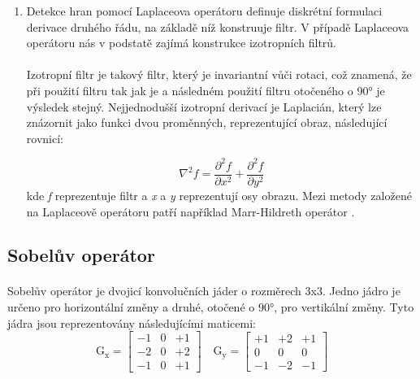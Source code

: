 \begin{enumerate}
    \item Detekce hran pomocí Laplaceova operátoru definuje diskrétní formulaci derivace druhého řádu, na základě níž konstruuje filtr. V případě Laplaceova operátoru nás v podstatě zajímá konstrukce izotropních filtrů.
    \paragraph{} Izotropní filtr je takový filtr, který je invariantní vůči rotaci, což znamená, že při použití filtru tak jak je a následném použití filtru otočeného o 90° je výsledek stejný. Nejjednodušší izotropní derivací je Laplacián, který lze znázornit jako funkci dvou proměnných, reprezentující obraz, následující rovnicí:

    \begin{equation}
    \nabla^2 f=\frac{\partial^2 f}{\partial x^2}+\frac{\partial^2 f}{\partial y^2}
    \end{equation}
    kde \textit{f} reprezentuje filtr a \textit{x} a \textit{y} reprezentují osy obrazu. Mezi metody založené na Laplaceově operátoru patří například Marr-Hildreth operátor \cite{edge_types}.

\end{enumerate}


\subsection*{Sobelův operátor}
\paragraph{} Sobelův operátor je dvojicí konvolučních jáder o rozměrech 3x3. Jedno jádro je určeno pro horizontální změny a druhé, otočené o 90°, pro vertikální změny. Tyto jádra jsou reprezentovány následujícími maticemi:
\begin{equation}
\mathrm{G}_{\mathrm{x}}=\left[\begin{array}{lll}
-1 & 0 & +1 \\
-2 & 0 & +2 \\
-1 & 0 & +1
\end{array}\right] \quad \mathrm{G}_{\mathrm{y}}=\left[\begin{array}{ccc}
+1 & +2 & +1 \\
0 & 0 & 0 \\
-1 & -2 & -1
\end{array}\right]
\end{equation}

